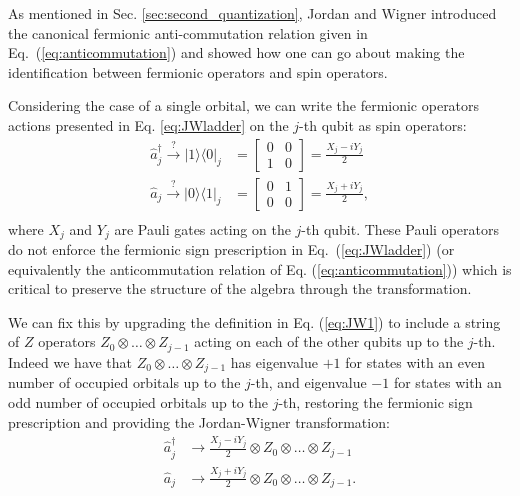 As mentioned in Sec. \ref{sec:second_quantization}, Jordan and Wigner \cite{Jordan1928} introduced the canonical fermionic anti-commutation relation given in Eq.~(\ref{eq:anticommutation}) and showed how one can go about making the identification between fermionic operators and spin operators.

Considering the case of a single orbital, we can write the fermionic operators actions presented in Eq. \ref{eq:JWladder} on the $j$-th qubit as spin operators:
\begin{equation}
\label{eq:JW1}
\begin{aligned}
\hat{a}_{j}^{\dagger} \xrightarrow{?} |1\rangle \langle 0|_j
&=\left[\begin{array}{ll}
0 & 0 \\
1 & 0
\end{array}\right]=\frac{X_{j}-i Y_{j}}{2} \\
\hat{a}_{j} \xrightarrow{?} |0\rangle \langle 1|_j
&=\left[\begin{array}{ll}
0 & 1 \\
0 & 0
\end{array}\right]=\frac{X_{j}+i Y_{j}}{2}, \\
\end{aligned}
\end{equation}
where $X_j$ and $Y_j$ are Pauli gates acting on the $j$-th qubit.
These Pauli operators do not enforce the fermionic sign prescription in Eq.~(\ref{eq:JWladder}) (or equivalently the anticommutation relation of Eq. (\ref{eq:anticommutation})) which is critical to preserve the structure of the algebra through the transformation.

We can fix this by upgrading the definition in Eq. (\ref{eq:JW1}) to include a string of $Z$ operators $Z_{0} \otimes \dots \otimes Z_{j-1}$ acting on each of the other qubits up to the $j$-th.
Indeed we have that $Z_{0} \otimes \dots \otimes Z_{j-1}$ has eigenvalue $+1$ for states with an even number of occupied orbitals up to the $j$-th, and eigenvalue $-1$ for states with an odd number of occupied orbitals up to the $j$-th, restoring the fermionic sign prescription and providing the Jordan-Wigner transformation:
\begin{equation}
\label{eq:JW2}
\begin{aligned}
\hat{a}_{j}^{\dagger} &\to \frac{X_{j}-i Y_{j}}{2} \otimes Z_{0} \otimes \dots \otimes Z_{j-1}\\
\hat{a}_{j} &\to \frac{X_{j}+i Y_{j}}{2} \otimes Z_{0} \otimes \dots \otimes Z_{j-1}.
\end{aligned}
\end{equation}


